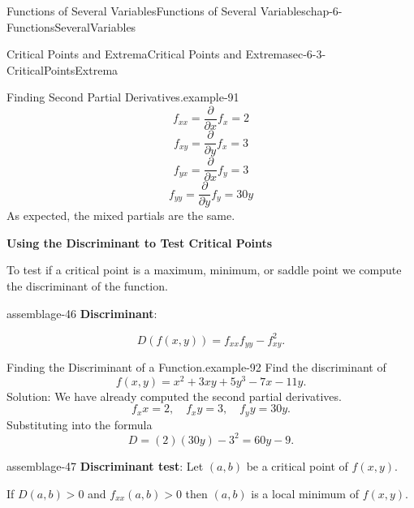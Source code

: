 \documentclass[oneside,10pt,]{book}
\newcommand{\terminology}[1]{\textbf{#1}}
\numberwithin{equation}{section}
\begin{document}
\begin{chapterptx}{Functions of Several Variables}{}{Functions of Several Variables}{}{}{chap-6-FunctionsSeveralVariables}
\begin{sectionptx}{Critical Points and Extrema}{}{Critical Points and Extrema}{}{}{sec-6-3-CriticalPointsExtrema}
\begin{example}{Finding Second Partial Derivatives.}{example-91}
%
\begin{equation*}
f_{xx}=\frac{\partial}{\partial x} f_x=2
\end{equation*}
%
\begin{equation*}
f_{xy}=\frac{\partial}{\partial y} f_x=3
\end{equation*}
%
\begin{equation*}
f_{yx}=\frac{\partial}{\partial x} f_y=3
\end{equation*}
%
\begin{equation*}
f_{yy}=\frac{\partial}{\partial y} f_y=30y
\end{equation*}
\hypertarget{p-2358}{}%
As expected, the mixed partials are the same.%
\end{example}
\hypertarget{p-2359}{}%
\terminology{Using the Discriminant to Test Critical Points}%
\par
\hypertarget{p-2360}{}%
To test if a critical point is a maximum, minimum, or saddle point we compute the discriminant of the function.%
\begin{assemblage}{}{assemblage-46}%
\hypertarget{p-2361}{}%
\terminology{Discriminant}:%
\par
\hypertarget{p-2362}{}%
%
\begin{equation*}
D(f(x,y))=f_{xx} f_{yy}-f_{xy}^2.
\end{equation*}
%
\end{assemblage}
\begin{example}{Finding the Discriminant of a Function.}{example-92}%
\hypertarget{p-2363}{}%
Find the discriminant of%
%
\begin{equation*}
f(x,y)=x^2+ 3xy+5y^3-7x-11y.  
\end{equation*}
\hypertarget{p-2364}{}%
Solution:  We have already computed the second partial derivatives.%
%
\begin{equation*}
f_xx=2,\quad f_xy=3,\quad   f_yy=30y.
\end{equation*}
\hypertarget{p-2365}{}%
Substituting into the formula%
%
\begin{equation*}
D=(2)(30y)-3^2=60y-9.
\end{equation*}
\end{example}
\begin{assemblage}{}{assemblage-47}%
\hypertarget{p-2366}{}%
\terminology{Discriminant test}: Let \((a,b)\)  be a critical point of \(f(x,y)\).%
\par
\hypertarget{p-2367}{}%
If \(D(a,b)>0\) and \(f_{xx} (a,b)>0\) then \((a,b)\) is a local minimum of \(f(x,y)\).%
\par

\end{assemblage}
\end{sectionptx}
\end{chapterptx}
\end{document}
